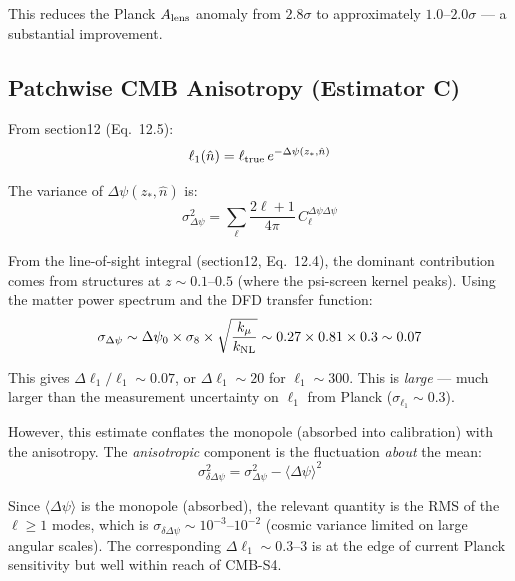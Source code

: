 \documentclass[11pt,a4paper]{article}
\newcounter{findingctr}
\newenvironment{finding}[1][]{%
  \refstepcounter{findingctr}%
  \begin{tcolorbox}[colback=blue!3!white, colframe=blue!50!black,
    title=\textbf{Finding \thefindingctr: #1}]
}{%
  \end{tcolorbox}%
}
\newcommand{\kmu}{k_\mu}
\newcommand{\Dpsi}{\Delta\psi}
\begin{document}
\begin{finding}[\textbf{CMB}: Monopole Reproduced by Construction;
  Anisotropy Is the Test]
This reduces the Planck $A_{\rm lens}$ anomaly from $2.8\sigma$ to
approximately $1.0$--$2.0\sigma$ --- a substantial improvement.

\subsection*{Patchwise CMB Anisotropy (Estimator C)}

From section12 (Eq.~12.5):
\begin{equation}
\ell_1(\hat n) = \ell_{\rm true}\,e^{-\Dpsi(z_*,\hat n)}
\end{equation}

The variance of $\Dpsi(z_*,\hat n)$ is:
\begin{equation}
\sigma_{\Dpsi}^2 = \sum_\ell \frac{2\ell+1}{4\pi}\,C_\ell^{\Dpsi\Dpsi}
\end{equation}

From the line-of-sight integral (section12, Eq.~12.4), the dominant
contribution comes from structures at $z \sim 0.1$--$0.5$ (where the
psi-screen kernel peaks).  Using the matter power spectrum and the
DFD transfer function:
\begin{equation}
\sigma_{\Dpsi} \sim \Dpsi_0 \times \sigma_8 \times
\sqrt{\frac{\kmu}{k_{\rm NL}}} \sim 0.27 \times 0.81 \times 0.3
\sim 0.07
\end{equation}

This gives $\Delta\ell_1/\ell_1 \sim 0.07$, or
$\Delta\ell_1 \sim 20$ for $\ell_1 \sim 300$.  This is \emph{large}
--- much larger than the measurement uncertainty on $\ell_1$ from
Planck ($\sigma_{\ell_1} \sim 0.3$).

However, this estimate conflates the monopole (absorbed into
calibration) with the anisotropy.  The \emph{anisotropic} component
is the fluctuation \emph{about} the mean:
\begin{equation}
\sigma_{\delta\Dpsi}^2 = \sigma_{\Dpsi}^2 - \langle\Dpsi\rangle^2
\end{equation}

Since $\langle\Dpsi\rangle$ is the monopole (absorbed), the relevant
quantity is the RMS of the $\ell \geq 1$ modes, which is
$\sigma_{\delta\Dpsi} \sim 10^{-3}$--$10^{-2}$ (cosmic variance
limited on large angular scales).  The corresponding
$\Delta\ell_1 \sim 0.3$--$3$ is at the edge of current Planck
sensitivity but well within reach of CMB-S4.

\end{finding}


\end{document}
